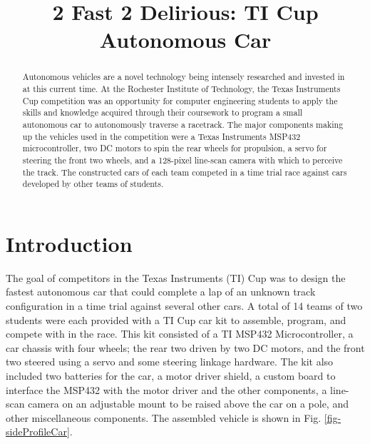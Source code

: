\documentclass{article}
\title{2 Fast 2 Delirious: TI Cup Autonomous Car}
\begin{document}
%
\maketitle
%
\begin{abstract}
Autonomous vehicles are a novel technology being intensely researched and invested in at this current time. At the Rochester Institute of Technology, the Texas Instruments Cup competition was an opportunity for computer engineering students to apply the skills and knowledge acquired through their coursework to program a small autonomous car to autonomously traverse a racetrack. The major components making up the vehicles used in the competition were a Texas Instruments MSP432 microcontroller, two DC motors to spin the rear wheels for propulsion, a servo for steering the front two wheels, and a 128-pixel line-scan camera with which to perceive the track. The constructed cars of each team competed in a time trial race against cars developed by other teams of students.

\end{abstract}


\section{Introduction}
\label{sec:intro}
The goal of competitors in the Texas Instruments (TI) Cup was to design the fastest autonomous car that could complete a lap of an unknown track configuration in a time trial against several other cars. A total of 14 teams of two students were each provided with a TI Cup car kit to assemble, program, and compete with in the race. This kit consisted of a TI MSP432 Microcontroller, a car chassis with four wheels; the rear two driven by two DC motors, and the front two steered using a servo and some steering linkage hardware. The kit also included two batteries for the car, a motor driver shield, a custom board to interface the MSP432 with the motor driver and the other components, a line-scan camera on an adjustable mount to be raised above the car on a pole, and other miscellaneous components. The assembled vehicle is shown in Fig. \ref{fig-sideProfileCar}.
\end{document}
